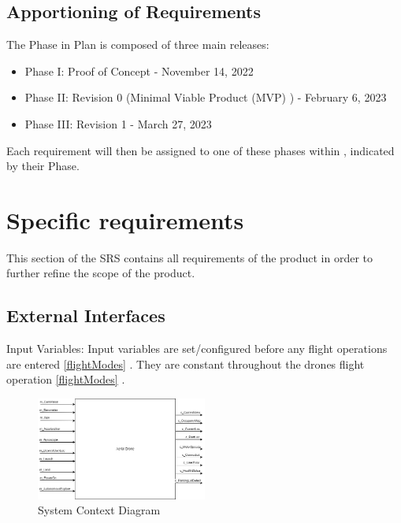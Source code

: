 \documentclass{article}
\begin{document}
\subsection{Apportioning of Requirements}
The Phase in Plan is composed of three main releases:  
\begin{itemize}
    \item Phase I: Proof of Concept - November 14, 2022
    \item Phase II: Revision 0 (Minimal Viable Product (MVP) ) - February 6, 2023 
    \item Phase III: Revision 1 - March 27, 2023
\end{itemize}
Each requirement will then be assigned to one of these phases within , indicated by their Phase. 

\section{Specific requirements }
\label{sec:Req}
This section of the SRS contains all requirements of the product in order to further refine the scope of the product.

\subsection{External Interfaces}
Input Variables: Input variables are set/configured before any flight operations are entered \ref{flightModes} . They are constant throughout the drones flight operation \ref{flightModes} .


\begin{figure}[!h]
  \begin{center} 
  \caption{System Context Diagram} 
 
        \includegraphics[width=0.5\textwidth]{ContextDiagram.png}
  \end{center}
\end{figure}
\end{document}
